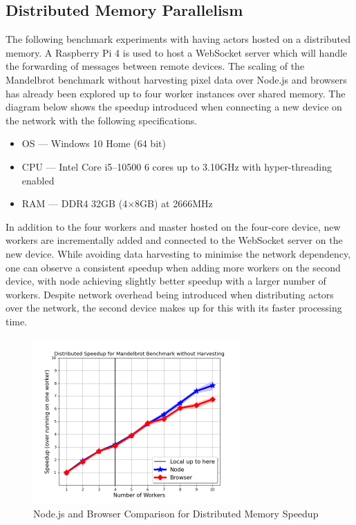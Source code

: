 \documentclass[12pt, a4paper]{report}
\theoremstyle{definition}
\theoremstyle{definition}%
\theoremstyle{definition}%
\theoremstyle{definition}%
\theoremstyle{definition}%
\theoremstyle{definition}%
\begin{document}
\subsection{Distributed Memory Parallelism}
The following benchmark experiments with having actors hosted on a distributed memory. A Raspberry Pi 4 is used to host a WebSocket server which will handle the forwarding of messages between remote devices. The scaling of the Mandelbrot benchmark without harvesting pixel data over Node.js and browsers has already been explored up to four worker instances over shared memory. The diagram below shows the speedup introduced when connecting a new device on the network with the following specifications.
\begin{itemize}
    \item OS --- Windows 10 Home (64 bit)
    \item CPU --- Intel Core i5--10500 6 cores up to 3.10GHz with hyper-threading enabled
    \item RAM --- DDR4 32GB (4$\times$8GB) at 2666MHz
\end{itemize}
In addition to the four workers and master hosted on the four-core device, new workers are incrementally added and connected to the WebSocket server on the new device. While avoiding data harvesting to minimise the network dependency, one can observe a consistent speedup when adding more workers on the second device, with node achieving slightly better speedup with a larger number of workers. Despite network overhead being introduced when distributing actors over the network, the second device makes up for this with its faster processing time.
\begin{figure}[H]
    \begin{centering}
        \includegraphics[width=300px]{resources/distributed_memory_speedup.png}
        \caption{Node.js and Browser Comparison for Distributed Memory Speedup}
    \end{centering}
\end{figure}
\end{document}
